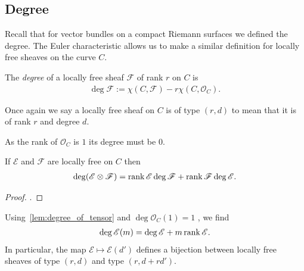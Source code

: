 \documentclass[12pt]{ociamthesis}  %
\begin{document}
\begin{lemma}
\end{lemma}

\begin{lemma}\label{lem:hilbert_base_change}
\end{lemma}

\subsection{Degree}

Recall that for vector bundles on a compact Riemann surfaces we defined the
degree.  The Euler characteristic allows us to make a similar definition for
locally free sheaves on the curve $C$.

\begin{definition}
  The \emph{degree} of a locally free sheaf $\mathscr F$ of rank $r$
  on $C$ is
  \begin{align*}
    \deg \mathscr F := \chi (C,\mathscr F) - r\chi(C,\mathscr O_C).
  \end{align*}
\end{definition}

Once again we say a locally free sheaf on $C$ is of
type $(r,d)$ to mean that it is of rank $r$ and degree $d$.

\begin{example}
  As the rank of $\mathscr O_C$ is $1$ its degree must be $0$.
\end{example}

\begin{lemma}\label{lem:degree_of_tensor}
  If $\mathscr E$ and $\mathscr F$ are locally free on $C$ then
  \begin{align*}
    \deg(\mathscr E\otimes\mathscr F) = \operatorname{rank}\mathscr E\deg\mathscr F + \operatorname{rank}\mathscr F\deg\mathscr E.
  \end{align*}
  \begin{proof}
    \cite[Exercise 8.24]{hoskins2016}.
    \missingproof
  \end{proof}
\end{lemma}

\begin{example}
  Using~\ref{lem:degree_of_tensor} and $\deg\mathscr O_C(1)=1$ \missingcitation,
  we find
  \begin{align*}
    \deg \mathscr E(m) = \deg\mathscr E + m\operatorname{rank}\mathscr E.
  \end{align*}
  In particular, the map $\mathscr E \mapsto \mathscr E(d')$ defines
  a bijection between locally free sheaves of type $(r,d)$ and
  type $(r,d+rd')$.
\end{example}
\end{document}

